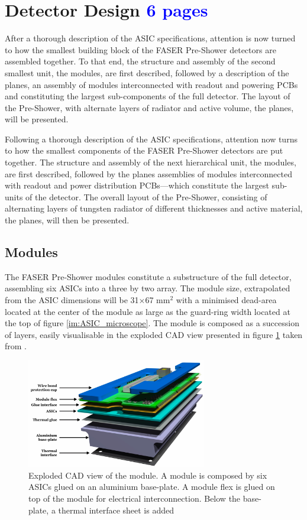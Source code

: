 	\section{Detector Design \textcolor{blue}{ 6 pages}}
 	After a thorough description of the ASIC specifications,  attention is now turned to how the smallest building block of the FASER Pre-Shower detectors are assembled together. To that end, the structure and assembly of the second smallest unit, the modules, are first described, followed by a description of the planes, an assembly of modules interconnected with readout and powering PCBs and constituting the largest sub-components of the full detector. 
 	The layout of the Pre-Shower, with alternate layers of radiator and active volume, the planes, will be presented.
 	
 	Following a thorough description of the ASIC specifications, attention now turns to how the smallest components of the FASER Pre-Shower detectors are put together. The structure and assembly of the next hierarchical unit, the modules, are first described, followed by the planes assemblies of modules interconnected with readout and power distribution PCBs—which constitute the largest sub-units of the detector.
	The overall layout of the Pre-Shower, consisting of alternating layers of tungsten radiator of different thicknesses and active material, the planes, will then be presented.
 
		\subsection{Modules}
		
		The FASER Pre-Shower modules constitute a substructure of the full detector, assembling six ASICs into a three by two array. The module size, extrapolated from the ASIC dimensions will be 31$\times$67 mm$^2$ with a minimised dead-area located at the center of the module as large as the guard-ring width located at the top of figure \ref{im:ASIC_microscope}. The module is composed as a succession of layers, easily visualisable in the exploded CAD view presented in figure \ref{im:module_CAD} taken from \cite{PreShower_TP}.
		
		\begin{figure}[h]
			\centering
			\includegraphics[width=0.7\textwidth]{files/module_CAD}
			\caption{Exploded CAD view of the module. A module is composed by six ASICs glued on an aluminium base-plate. A module flex is glued on top of the module for electrical interconnection. Below the base-plate, a thermal interface sheet is added }
			\label{im:module_CAD}
		\end{figure}
		
